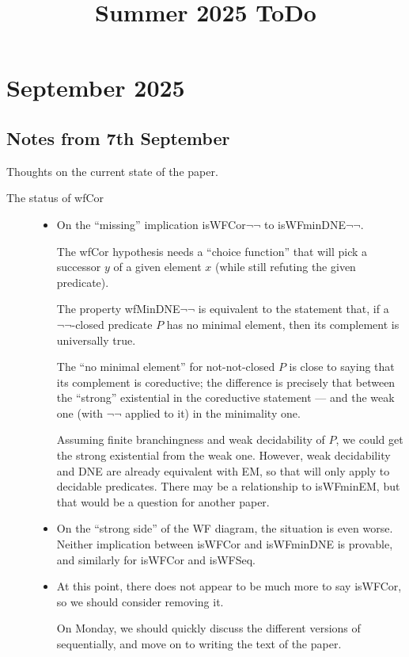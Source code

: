 \documentclass{article}
\begin{document}
\title{Summer 2025 ToDo}
\maketitle

\section*{September 2025}
\subsection*{Notes from 7th September}
Thoughts on the current state of the paper.
\begin{description}
\item[The status of wfCor]
  \begin{itemize}
    \item 
      On the ``missing'' implication isWFCor$\lnot\lnot$ to isWFminDNE$\lnot\lnot$.

      The wfCor hypothesis needs a ``choice function'' that will pick a successor $y$ of a given element $x$
      (while still refuting the given predicate). 

      The property wfMinDNE$\lnot\lnot$ is equivalent to the statement that, if a $\lnot\lnot$-closed 
      predicate $P$ has no minimal element, then its complement is universally true.

      The ``no minimal element'' for not-not-closed $P$ is close to saying that its complement is coreductive; 
      the difference is precisely that between the ``strong'' existential in the coreductive statement ---
      and the weak one (with $\lnot\lnot$ applied to it) in the minimality one.

      Assuming finite branchingness and weak decidability of $P$, we could get the strong existential 
      from the weak one.  However, weak decidability and DNE are already equivalent with EM, so that 
      will only apply to decidable predicates.  There may be a relationship to isWFminEM, but that 
      would be a question for another paper.

    \item 
      On the ``strong side'' of the WF diagram, the situation is even worse.
      Neither implication between isWFCor and isWFminDNE is provable, and similarly for isWFCor and isWFSeq. 

    \item 
      At this point, there does not appear to be much more to say isWFCor, so we should consider removing it.

      On Monday, we should quickly discuss the different versions of sequentially,
      and move on to writing the text of the paper.
    \end{itemize}
\end{description} 
\end{document}
